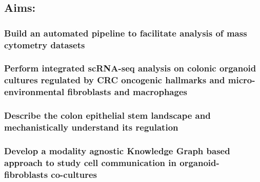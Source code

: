 
\subsection{Aims:}

\subsubsection{Build an automated pipeline to facilitate analysis of mass cytometry datasets}

\subsubsection{Perform integrated scRNA-seq analysis on colonic organoid cultures regulated by CRC oncogenic hallmarks and micro-environmental fibroblasts and macrophages}

\subsubsection{Describe the colon epithelial stem landscape and mechanistically understand its regulation}

\subsubsection{Develop a modality agnostic Knowledge Graph based approach to study cell communication in organoid-fibroblasts co-cultures}





